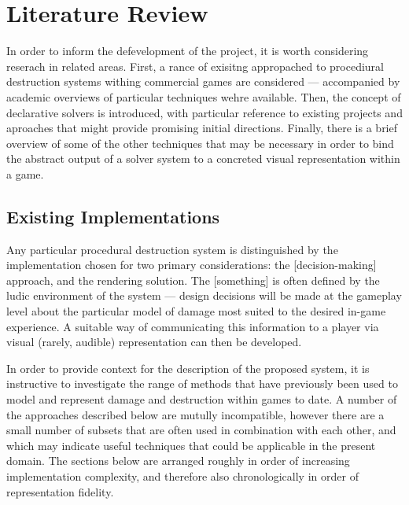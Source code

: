 \documentclass[11pt]{report}
\begin{document}
\chapter{Literature Review}
	In order to inform the defevelopment of the project, it is worth considering reserach in related areas. First, a rance of exisitng appropached to procediural destruction systems withing commercial games are considered --- accompanied by academic overviews of particular techniques wehre available. Then, the concept of declarative solvers is introduced, with particular reference to existing projects and aproaches that might provide promising initial directions. Finally, there is a brief overview of some of the other techniques that may be necessary in order to bind the abstract output of a solver system to a concreted visual representation within a game.

	\section{Existing Implementations}
		Any particular procedural destruction system is distinguished by the implementation chosen for two primary considerations: the [decision-making] approach, and the rendering solution. The [something] is often defined by the ludic environment of the system --- design decisions will be made at the gameplay level about the particular model of damage most suited to the desired in-game experience. A suitable way of communicating this information to a player via visual (rarely, audible) representation can then be developed.

		In order to provide context for the description of the proposed system, it is instructive to investigate the range of methods that have previously been used to model and represent damage and destruction within games to date. A number of the approaches described below are mutully incompatible, however there are a small number of subsets that are often used in combination with each other, and which may indicate useful techniques that could be applicable in the present domain. The sections below are arranged roughly in order of increasing implementation complexity, and therefore also chronologically in order of representation fidelity.
\end{document}
